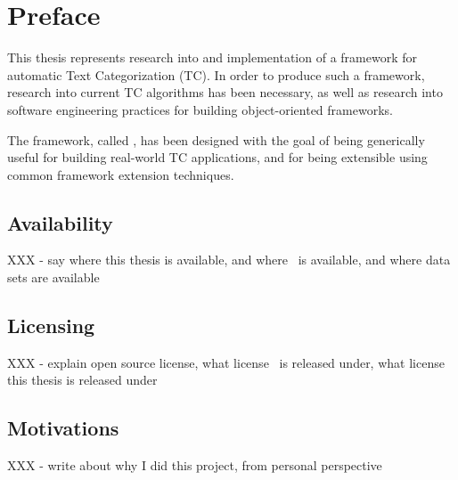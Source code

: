\chapter*{Preface}

This thesis represents research into and implementation of a framework
for automatic Text Categorization (TC).  In order to produce such a
framework, research into current TC algorithms has been necessary, as
well as research into software engineering practices for building
object-oriented frameworks.

The framework, called \aicat, has been designed with the goal of being
generically useful for building real-world TC applications, and for
being extensible using common framework extension techniques.

\section*{Availability}

XXX - say where this thesis is available, and where \aicat\ is
available, and where data sets are available

\section*{Licensing}

XXX - explain open source license, what license \aicat\ is released
under, what license this thesis is released under

\section*{Motivations}

XXX - write about why I did this project, from personal perspective
